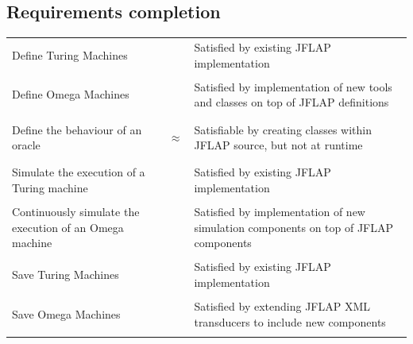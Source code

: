 \documentclass[12pt]{article}
\newcommand{\cmark}{\ding{51}}
\begin{document}
	\clearpage\subsection{Requirements completion}
		\begin{table}[h!]
			\centering
			\small
			\begin{tabular}{m{2in} m{0.5in} m{3in}}
				Define Turing Machines & \begin{center}\textcolor{ForestGreen}{{\Large \cmark}}\end{center}& Satisfied by existing JFLAP implementation \\\\
				Define Omega Machines & \begin{center}\textcolor{ForestGreen}{{\Large \cmark}}\end{center} & Satisfied by implementation of new tools and classes on top of JFLAP definitions \\\\
				Define the behaviour of an oracle & \begin{center}\textcolor{Peach}{{\Large $ \approx $}}\end{center} & Satisfiable by creating classes within JFLAP source, but not at runtime \\\\
				Simulate the execution of a Turing machine & \begin{center}\textcolor{ForestGreen}{{\Large \cmark}}\end{center} & Satisfied by existing JFLAP implementation \\\\
				Continuously simulate the execution of an Omega machine & \begin{center}\textcolor{ForestGreen}{{\Large \cmark}}\end{center} & Satisfied by implementation of new simulation components on top of JFLAP components \\\\
				Save Turing Machines & \begin{center}\textcolor{ForestGreen}{{\Large \cmark}}\end{center} & Satisfied by existing JFLAP implementation \\\\
				Save Omega Machines & \begin{center}\textcolor{ForestGreen}{{\Large \cmark}}\end{center} & Satisfied by extending JFLAP XML transducers to include new components \\\\

\end{tabular}
\end{table}
\end{document}
